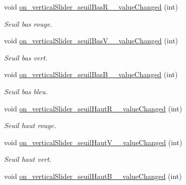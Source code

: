 \begin{DoxyCompactItemize}
void \hyperlink{classMainWindow_a8d42f39e072db3ba34dbd693fb3e03b1}{on\+\_\+vertical\+Slider\+\_\+seuil\+Bas\+R\+\_\+\_\+value\+Changed} (int)
\begin{DoxyCompactList}\small\item\em Seuil bas rouge. \end{DoxyCompactList}\item 
\mbox{\label{classMainWindow_aff55460fade4cfec35d634a75e53f2b0}} 
void \hyperlink{classMainWindow_aff55460fade4cfec35d634a75e53f2b0}{on\+\_\+vertical\+Slider\+\_\+seuil\+Bas\+V\+\_\+\_\+value\+Changed} (int)
\begin{DoxyCompactList}\small\item\em Seuil bas vert. \end{DoxyCompactList}\item 
\mbox{\label{classMainWindow_a4da5b6fd53c17717eb29e287a0d3b49d}} 
void \hyperlink{classMainWindow_a4da5b6fd53c17717eb29e287a0d3b49d}{on\+\_\+vertical\+Slider\+\_\+seuil\+Bas\+B\+\_\+\_\+value\+Changed} (int)
\begin{DoxyCompactList}\small\item\em Seuil bas bleu. \end{DoxyCompactList}\item 
\mbox{\label{classMainWindow_adb86796f8b99a463f50b10cd98d44676}} 
void \hyperlink{classMainWindow_adb86796f8b99a463f50b10cd98d44676}{on\+\_\+vertical\+Slider\+\_\+seuil\+Haut\+R\+\_\+\_\+value\+Changed} (int)
\begin{DoxyCompactList}\small\item\em Seuil haut rouge. \end{DoxyCompactList}\item 
\mbox{\label{classMainWindow_a7800e4bb1bbfe1e956e4379ce7127677}} 
void \hyperlink{classMainWindow_a7800e4bb1bbfe1e956e4379ce7127677}{on\+\_\+vertical\+Slider\+\_\+seuil\+Haut\+V\+\_\+\_\+value\+Changed} (int)
\begin{DoxyCompactList}\small\item\em Seuil haut vert. \end{DoxyCompactList}\item 
\mbox{\label{classMainWindow_a697625302189c63431547221bc6cbab2}} 
void \hyperlink{classMainWindow_a697625302189c63431547221bc6cbab2}{on\+\_\+vertical\+Slider\+\_\+seuil\+Haut\+B\+\_\+\_\+value\+Changed} (int)

\end{DoxyCompactItemize}
